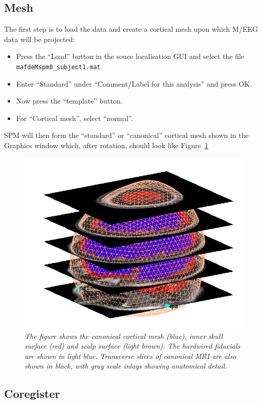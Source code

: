 \subsection{Mesh}
The first step is to load the data and create a cortical mesh upon which M/EEG data will be projected:
\begin{itemize}
\item{Press the ``Load'' button in the souce localisation GUI and select the file \texttt{mafdeMspm8\_subject1.mat}.}
\item{Enter ``Standard'' under ``Comment/Label for this analysis'' and press OK.}
\item{Now press the ``template'' button.}
\item{For ``Cortical mesh'', select ``normal''.}
\end{itemize}
SPM will then form the ``standard'' or ``canonical'' cortical mesh shown in the Graphics window which, after rotation, should look like Figure~\ref{mesh}
\begin{figure}
\begin{center}
\includegraphics[width=120mm]{mmn/mesh}
\caption{\em The figure shows the canonical cortical mesh (blue), inner skull surface (red) and scalp surface (light brown). The hardwired fiducials are shown in light blue. Transverse slices of canonical MRI are also shown in black, with gray scale inlays showing anatomical detail.
\label{mesh}}
\end{center}
\end{figure}

\subsection{Coregister}

